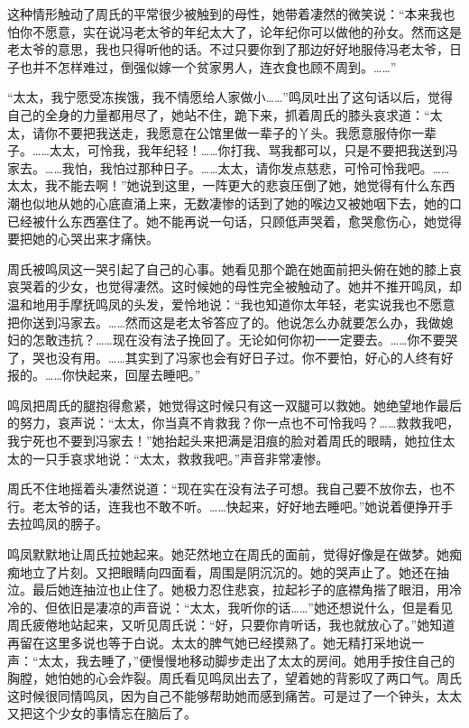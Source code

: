 \par 这种情形触动了周氏的平常很少被触到的母性，她带着凄然的微笑说：“本来我也怕你不愿意，实在说冯老太爷的年纪太大了，论年纪你可以做他的孙女。然而这是老太爷的意思，我也只得听他的话。不过只要你到了那边好好地服侍冯老太爷，日子也并不怎样难过，倒强似嫁一个贫家男人，连衣食也顾不周到。……”
\par “太太，我宁愿受冻挨饿，我不情愿给人家做小……”鸣凤吐出了这句话以后，觉得自己的全身的力量都用尽了，她站不住，跪下来，抓着周氏的膝头哀求道：“太太，请你不要把我送走，我愿意在公馆里做一辈子的丫头。我愿意服侍你一辈子。……太太，可怜我，我年纪轻！……你打我、骂我都可以，只是不要把我送到冯家去。……我怕，我怕过那种日子。……太太，请你发点慈悲，可怜可怜我吧。……太太，我不能去啊！”她说到这里，一阵更大的悲哀压倒了她，她觉得有什么东西潮也似地从她的心底直涌上来，无数凄惨的话到了她的喉边又被她咽下去，她的口已经被什么东西塞住了。她不能再说一句话，只顾低声哭着，愈哭愈伤心，她觉得要把她的心哭出来才痛快。
\par 周氏被鸣凤这一哭引起了自己的心事。她看见那个跪在她面前把头俯在她的膝上哀哀哭着的少女，也觉得凄然。这时候她的母性完全被触动了。她并不推开鸣凤，却温和地用手摩抚鸣凤的头发，爱怜地说：“我也知道你太年轻，老实说我也不愿意把你送到冯家去。……然而这是老太爷答应了的。他说怎么办就要怎么办，我做媳妇的怎敢违抗？……现在没有法子挽回了。无论如何你初一一定要去。……你不要哭了，哭也没有用。……其实到了冯家也会有好日子过。你不要怕，好心的人终有好报的。……你快起来，回屋去睡吧。”
\par 鸣凤把周氏的腿抱得愈紧，她觉得这时候只有这一双腿可以救她。她绝望地作最后的努力，哀声说：“太太，你当真不肯救我？你一点也不可怜我吗？……救救我吧，我宁死也不要到冯家去！”她抬起头来把满是泪痕的脸对着周氏的眼睛，她拉住太太的一只手哀求地说：“太太，救救我吧。”声音非常凄惨。
\par 周氏不住地摇着头凄然说道：“现在实在没有法子可想。我自己要不放你去，也不行。老太爷的话，连我也不敢不听。……快起来，好好地去睡吧。”她说着便挣开手去拉鸣凤的膀子。
\par 鸣凤默默地让周氏拉她起来。她茫然地立在周氏的面前，觉得好像是在做梦。她痴痴地立了片刻。又把眼睛向四面看，周围是阴沉沉的。她的哭声止了。她还在抽泣。最后她连抽泣也止住了。她极力忍住悲哀，拉起衫子的底襟角揩了眼泪，用冷冷的、但依旧是凄凉的声音说：“太太，我听你的话……”她还想说什么，但是看见周氏疲倦地站起来，又听见周氏说：“好，只要你肯听话，我也就放心了。”她知道再留在这里多说也等于白说。太太的脾气她已经摸熟了。她无精打采地说一声：“太太，我去睡了，”便慢慢地移动脚步走出了太太的房间。她用手按住自己的胸膛，她怕她的心会炸裂。周氏看见鸣凤出去了，望着她的背影叹了两口气。周氏这时候很同情鸣凤，因为自己不能够帮助她而感到痛苦。可是过了一个钟头，太太又把这个少女的事情忘在脑后了。
